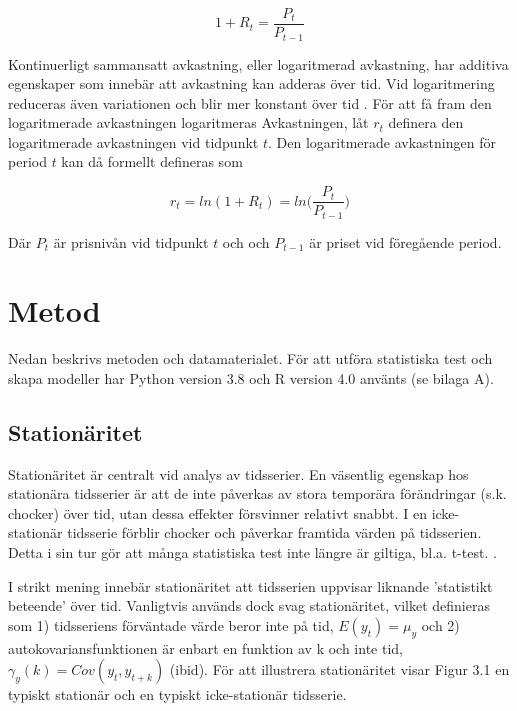 \documentclass[11pt]{article}
\numberwithin{equation}{section}
\numberwithin{table}{section}
\numberwithin{figure}{section}
\begin{document}
\begin{equation}
    1+R_{t} = \frac{P_{t}}{P_{t-1}}
\end{equation}


Kontinuerligt sammansatt avkastning, eller logaritmerad avkastning, har additiva egenskaper som innebär att avkastning kan adderas över tid.  Vid logaritmering reduceras även variationen och blir mer konstant över tid \parencite{tsay}. För att få fram den logaritmerade avkastningen logaritmeras  Avkastningen, låt $r_{t}$ definera den logaritmerade avkastningen vid tidpunkt $t$. Den logaritmerade avkastningen för period $t$ kan då formellt defineras som

\begin{equation}
    r_{t} = ln(1+R_{t}) = ln \Big( \frac{P_{t}}{P_{t-1}} \Big)
\end{equation}

Där $P_{t}$ är prisnivån vid tidpunkt $t$ och och $P_{t-1}$ är priset vid föregående period. 









\newpage
\section{Metod}
Nedan beskrivs metoden och datamaterialet. För att utföra statistiska test och skapa modeller har Python version 3.8 och R version 4.0 använts (se bilaga A). 

\subsection{Stationäritet}
Stationäritet är centralt vid analys av tidsserier. En väsentlig egenskap hos stationära tidsserier är att de inte påverkas av stora temporära förändringar (s.k. chocker) över tid, utan dessa effekter försvinner relativt snabbt. I en icke-stationär tidsserie förblir chocker och påverkar framtida värden på tidsserien. Detta i sin tur gör att många statistiska test inte längre är giltiga, bl.a. t-test. \parencite[][,s.329 f.]{montgomery2015forecasting}. \par

I strikt mening innebär stationäritet att tidsserien uppvisar liknande 'statistikt beteende' över tid. Vanligtvis används dock svag stationäritet, vilket definieras som 1) tidsseriens förväntade värde beror inte på tid, \(E(y_t)=\mu_y\) och 2) autokovariansfunktionen är enbart en funktion av k och inte tid, \(\gamma_y(k) = Cov(y_t, y_{t+k})\) (ibid). För att illustrera stationäritet visar Figur 3.1 en typiskt stationär och en typiskt icke-stationär tidsserie.
\end{document}
